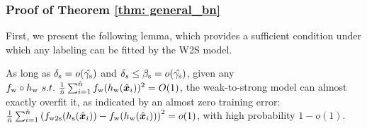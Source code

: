 \subsubsection{Proof of Theorem \ref{thm: general_bn}}\label{apdx: proof_benign_of}

First, we present the following lemma, which provides a sufficient condition under which any labeling can be fitted by the W2S model.

\begin{lemma}\label{lemma: overfitting_condition}
As long as $\delta_{\text{s}} = o(\hat{\gamma_{\text{s}}})$ and $\delta_s\leq \beta_{\text{s}}=o(\hat{\gamma_{\text{s}}})$, given any $f_{\text{w}} \circ h_{\text{w}}~s.t.~\frac{1}{\hat{n}}\sum_{i=1}^{\hat{n}} f_{\text{w}}(h_{\text{w}}( \hat{{\bm{x}}}_i ))^2=O(1)$, the weak-to-strong model can almost exactly overfit it, as indicated by an almost zero training error: $\frac{1}{\hat{n}}\sum_{i=1}^{\hat{n}} \left(f_{\text{w2s}}(h_{\text{s}}(\hat{{\bm{x}}}_i)) - f_{\text{w}}(h_{\text{w}}(\hat{{\bm{x}}}_i))\right)^2 = o(1)$, with high probability $1 - o(1)$. 
\end{lemma}
